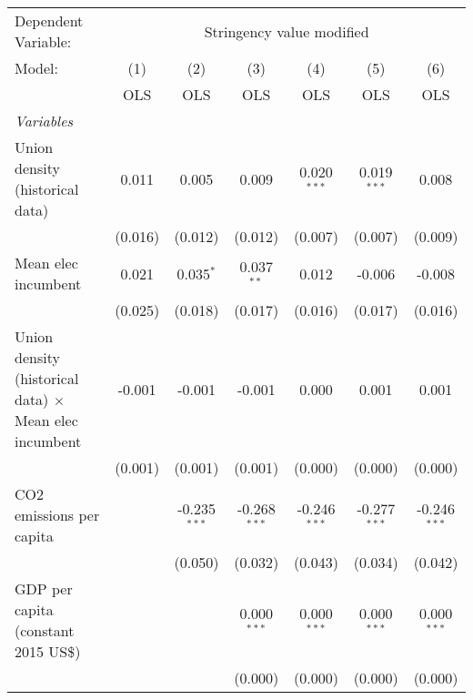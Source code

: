 
\begingroup
\centering
\begin{tabular}{lcccccc}
   \toprule
   Dependent Variable: & \multicolumn{6}{c}{Stringency value modified}\\
   Model:                                                        & (1)     & (2)            & (3)            & (4)            & (5)            & (6)\\  
                                                                 &  OLS    & OLS            & OLS            & OLS            & OLS            & OLS\\  
   \midrule
   \emph{Variables}\\
   Union density (historical data)                               & 0.011   & 0.005          & 0.009          & 0.020$^{***}$  & 0.019$^{***}$  & 0.008\\   
                                                                 & (0.016) & (0.012)        & (0.012)        & (0.007)        & (0.007)        & (0.009)\\   
   Mean elec incumbent                                           & 0.021   & 0.035$^{*}$    & 0.037$^{**}$   & 0.012          & -0.006         & -0.008\\   
                                                                 & (0.025) & (0.018)        & (0.017)        & (0.016)        & (0.017)        & (0.016)\\   
   Union density (historical data) $\times$ Mean elec incumbent  & -0.001  & -0.001         & -0.001         & 0.000          & 0.001          & 0.001\\   
                                                                 & (0.001) & (0.001)        & (0.001)        & (0.000)        & (0.000)        & (0.000)\\   
   CO2 emissions per capita                                      &         & -0.235$^{***}$ & -0.268$^{***}$ & -0.246$^{***}$ & -0.277$^{***}$ & -0.246$^{***}$\\   
                                                                 &         & (0.050)        & (0.032)        & (0.043)        & (0.034)        & (0.042)\\   
   GDP per capita (constant 2015 US\$)                           &         &                & 0.000$^{***}$  & 0.000$^{***}$  & 0.000$^{***}$  & 0.000$^{***}$\\   
                                                                 &         &                & (0.000)        & (0.000)        & (0.000)        & (0.000)\\   

\end{tabular}
